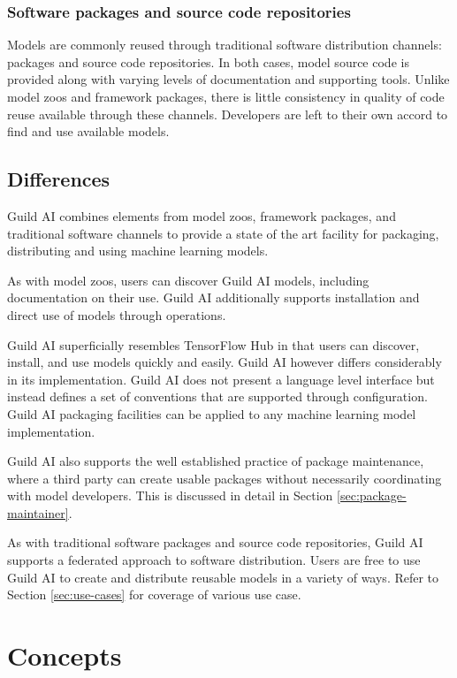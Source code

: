 \documentclass{article}
\begin{document}
\subsubsection{Software packages and source code repositories}

Models are commonly reused through traditional software distribution
channels: packages and source code repositories. In both cases, model
source code is provided along with varying levels of documentation and
supporting tools. Unlike model zoos and framework packages, there is
little consistency in quality of code reuse available through these
channels. Developers are left to their own accord to find and use
available models.

\subsection{Differences}

Guild AI combines elements from model zoos, framework packages, and
traditional software channels to provide a state of the art facility
for packaging, distributing and using machine learning models.

As with model zoos, users can discover Guild AI models, including
documentation on their use. Guild AI additionally supports
installation and direct use of models through operations.

Guild AI superficially resembles TensorFlow Hub in that users can
discover, install, and use models quickly and easily. Guild AI however
differs considerably in its implementation. Guild AI does not present
a language level interface but instead defines a set of conventions
that are supported through configuration. Guild AI packaging
facilities can be applied to any machine learning model
implementation.

Guild AI also supports the well established practice of package
maintenance, where a third party can create usable packages without
necessarily coordinating with model developers. This is discussed in
detail in Section \ref{sec:package-maintainer}.

As with traditional software packages and source code repositories,
Guild AI supports a federated approach to software distribution. Users
are free to use Guild AI to create and distribute reusable models in a
variety of ways. Refer to Section \ref{sec:use-cases} for coverage of
various use case.

\section{Concepts}
\end{document}
